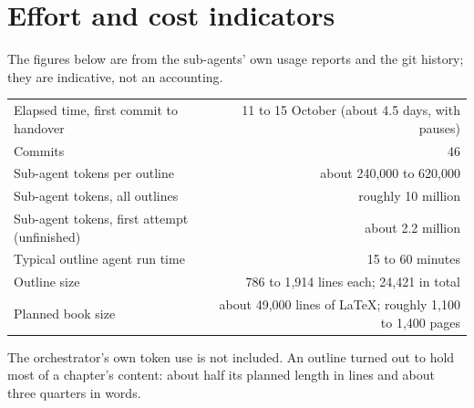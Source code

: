 \documentclass[11pt]{article}
\begin{document}
\section{Effort and cost indicators}
The figures below are from the sub-agents' own usage reports and the git history; they are indicative, not an
accounting.
\begin{center}\small
\begin{tabular}{lr}
\toprule
Elapsed time, first commit to handover & 11 to 15 October (about 4.5 days, with pauses)\\
Commits & 46\\
Sub-agent tokens per outline & about 240{,}000 to 620{,}000\\
Sub-agent tokens, all outlines & roughly 10 million\\
Sub-agent tokens, first attempt (unfinished) & about 2.2 million\\
Typical outline agent run time & 15 to 60 minutes\\
Outline size & 786 to 1{,}914 lines each; 24{,}421 in total\\
Planned book size & about 49{,}000 lines of LaTeX; roughly 1{,}100 to 1{,}400 pages\\
\bottomrule
\end{tabular}
\end{center}
The orchestrator's own token use is not included. An outline turned out to hold most of a chapter's content:
about half its planned length in lines and about three quarters in words.
\end{document}

